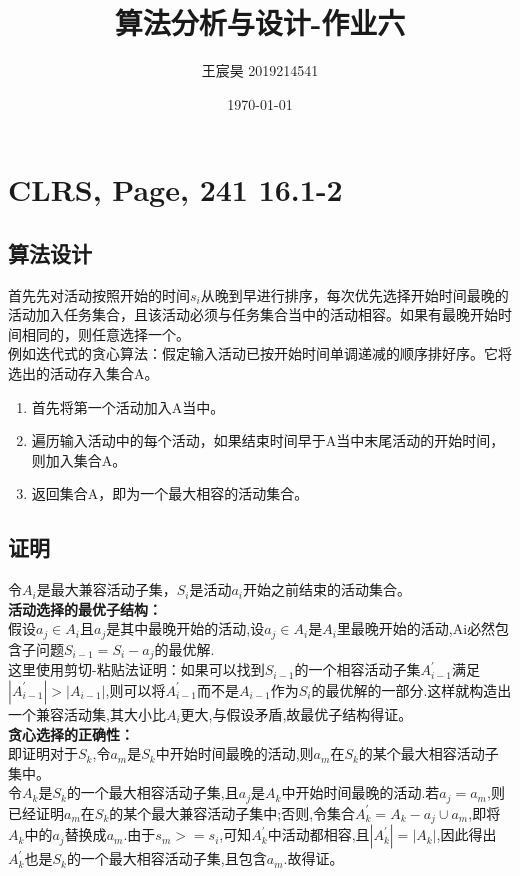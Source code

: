 \documentclass[UTF8]{ctexart}
\title{算法分析与设计-作业六}
\author{王宸昊 2019214541}
\date{\today}
\begin{document}
\maketitle


\section{CLRS, Page, 241 16.1-2}

\subsection{算法设计}
首先先对活动按照开始的时间$s_i$从晚到早进行排序，每次优先选择开始时间最晚的活动加入任务集合，且该活动必须与任务集合当中的活动相容。如果有最晚开始时间相同的，则任意选择一个。\\
例如迭代式的贪心算法：假定输入活动已按开始时间单调递减的顺序排好序。它将选出的活动存入集合A。
\begin{enumerate}[1.]

    \item 首先将第一个活动加入A当中。
    \item 遍历输入活动中的每个活动，如果结束时间早于A当中末尾活动的开始时间，则加入集合A。
    \item 返回集合A，即为一个最大相容的活动集合。
    
\end{enumerate}

\subsection{证明}
令$A_i$是最大兼容活动子集，$S_i$是活动$a_i$开始之前结束的活动集合。\\
\textbf{活动选择的最优子结构：}\\
假设$a_j \in A_i$且$a_j$是其中最晚开始的活动,设$a_j \in A_i$是$A_i$里最晚开始的活动,A{i}必然包含子问题$S_{i-1}=S_{i}-{a_j}$的最优解.\\
这里使用剪切-粘贴法证明：如果可以找到$S_{i-1}$的一个相容活动子集$A^\prime_{i-1}$满足$|A^\prime_{i-1}|>|A_{i-1}|$,则可以将$A^\prime_{i-1}$而不是$A_{i-1}$作为$S_i$的最优解的一部分.这样就构造出一个兼容活动集,其大小比$A_i$更大,与假设矛盾,故最优子结构得证。\\
\textbf{贪心选择的正确性：}\\
即证明对于$S_k$,令$a_m$是$S_k$中开始时间最晚的活动,则$a_m$在$S_k$的某个最大相容活动子集中。\\
令$A_k$是$S_k$的一个最大相容活动子集,且$a_j$是$A_k$中开始时间最晚的活动.若$a_j=a_m$,则已经证明$a_m$在$S_k$的某个最大兼容活动子集中;否则,令集合$A^\prime_k=A_k-{a_j}\cup {a_m}$,即将$A_k$中的$a_j$替换成$a_m$.由于$s_m>=s_i$,可知$A^\prime_k$中活动都相容,且$|A^\prime_k|=|A_k|$,因此得出$A^\prime_k$也是$S_k$的一个最大相容活动子集,且包含$a_m$.故得证。
\end{document}
